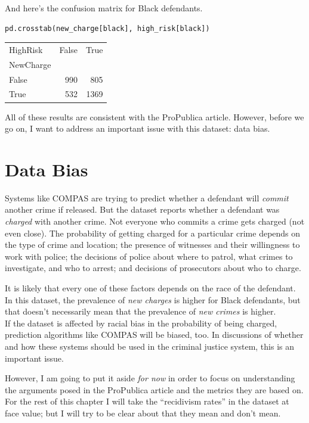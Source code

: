 And here's the confusion matrix for Black defendants.

\begin{lstlisting}[language=Python,style=source]
pd.crosstab(new_charge[black], high_risk[black])
\end{lstlisting}

\begin{tabular}{lrr}
\midrule
HighRisk & False & True \\
NewCharge &  &  \\
\midrule
False & 990 & 805 \\
True & 532 & 1369 \\
\midrule
\end{tabular}

All of these results are consistent with the ProPublica article.
However, before we go on, I want to address an important issue with this
dataset: data bias.

\hypertarget{data-bias}{%
\section{Data Bias}\label{data-bias}}

Systems like COMPAS are trying to predict whether a defendant will
\emph{commit} another crime if released. But the dataset reports whether
a defendant was \emph{charged} with another crime. Not everyone who
commits a crime gets charged (not even close). The probability of
getting charged for a particular crime depends on the type of crime and
location; the presence of witnesses and their willingness to work with
police; the decisions of police about where to patrol, what crimes to
investigate, and who to arrest; and decisions of prosecutors about who
to charge.

It is likely that every one of these factors depends on the race of the
defendant. In this dataset, the prevalence of \emph{new charges} is
higher for Black defendants, but that doesn't necessarily mean that the
prevalence of \emph{new crimes} is higher.\\
If the dataset is affected by racial bias in the probability of being
charged, prediction algorithms like COMPAS will be biased, too. In
discussions of whether and how these systems should be used in the
criminal justice system, this is an important issue.

However, I am going to put it aside \emph{for now} in order to focus on
understanding the arguments posed in the ProPublica article and the
metrics they are based on. For the rest of this chapter I will take the
``recidivism rates'' in the dataset at face value; but I will try to be
clear about that they mean and don't mean.

